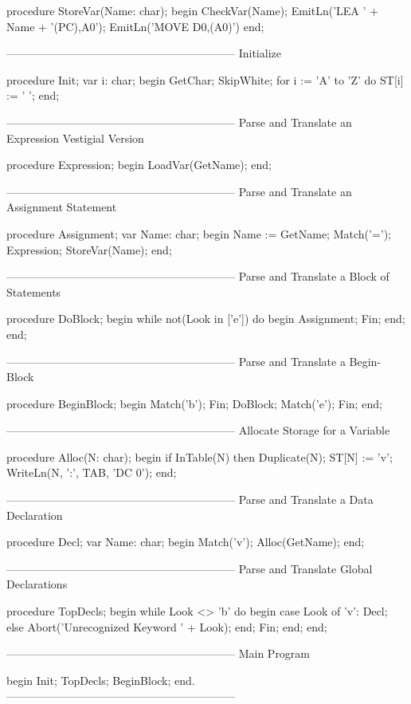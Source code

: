 \documentclass[float=false, crop=false]{standalone}
\begin{document}
\begin{code}
procedure StoreVar(Name: char);
begin
     CheckVar(Name);
     EmitLn('LEA ' + Name + '(PC),A0');
   EmitLn('MOVE D0,(A0)')
end;


{--------------------------------------------------------------}
{ Initialize }

procedure Init;
var i: char;
begin
     GetChar;
     SkipWhite;
     for i := 'A' to 'Z' do
          ST[i] := ' ';
end;


{--------------------------------------------------------------}
{ Parse and Translate an Expression }
{ Vestigial Version }

procedure Expression;
begin
     LoadVar(GetName);
end;


{--------------------------------------------------------------}
{ Parse and Translate an Assignment Statement }

procedure Assignment;
var Name: char;
begin
     Name := GetName;
     Match('=');
     Expression;
     StoreVar(Name);
end;


{--------------------------------------------------------------}
{ Parse and Translate a Block of Statements }

procedure DoBlock;
begin
     while not(Look in ['e']) do begin
          Assignment;
          Fin;
   end;
end;


{--------------------------------------------------------------}
{ Parse and Translate a Begin-Block }

procedure BeginBlock;
begin
     Match('b');
     Fin;
     DoBlock;
     Match('e');
     Fin;
end;


{--------------------------------------------------------------}
{ Allocate Storage for a Variable }

procedure Alloc(N: char);
begin
     if InTable(N) then Duplicate(N);
   ST[N] := 'v';
     WriteLn(N, ':', TAB, 'DC 0');
end;


{--------------------------------------------------------------}
{ Parse and Translate a Data Declaration }

procedure Decl;
var Name: char;
begin
   Match('v');
     Alloc(GetName);
end;


{--------------------------------------------------------------}
{ Parse and Translate Global Declarations }

procedure TopDecls;
begin
     while Look <> 'b' do begin
      case Look of
        'v': Decl;
      else Abort('Unrecognized Keyword ' + Look);
          end;
          Fin;
     end;
end;


{--------------------------------------------------------------}
{ Main Program }

begin
     Init;
     TopDecls;
     BeginBlock;
end.
{--------------------------------------------------------------}
\end{code}
\end{document}
